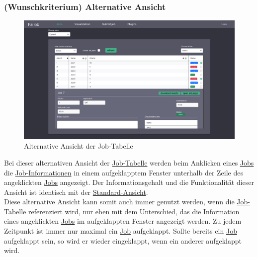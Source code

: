 \subsubsection{(Wunschkriterium) Alternative Ansicht}
\label{pages:job-table-alt}
\begin{figure}[H]
    \label{fig:job-table-exp}
    \includegraphics[width=\textwidth]{images-interface/v5_interface/job_table_expanded_5.pdf}
    \caption{Alternative Ansicht der Job-Tabelle}
\end{figure}
Bei dieser alternativen Ansicht der \hyperref[pages:job-table]{Job-Tabelle} werden beim Anklicken eines \hyperref[B:Jobs]{Jobs} die \hyperref[B:Job-Informationen]{Job-Informationen} in einem aufgeklapptem Fenster unterhalb der Zeile des angeklickten \hyperref[B:Jobs]{Jobs} angezeigt. Der Informationsgehalt und die Funktionalität dieser Ansicht ist identisch mit der  \hyperref[pages:job-table-default]{Standard-Ansicht}. \\
Diese alternative Ansicht kann somit auch immer genutzt werden, wenn die \hyperref[pages:job-table]{Job-Tabelle} referenziert wird, nur eben mit dem Unterschied, das die \hyperref[B:Job-Informationen]{Information} eines angeklickten \hyperref[B:Jobs]{Jobs} im aufgeklappten Fenster angezeigt werden.
Zu jedem Zeitpunkt ist immer nur maximal ein \hyperref[B:Jobs]{Job} aufgeklappt. Sollte bereits ein \hyperref[B:Jobs]{Job} aufgeklappt sein, so wird er wieder eingeklappt, wenn ein anderer aufgeklappt wird.\\



\newpage
